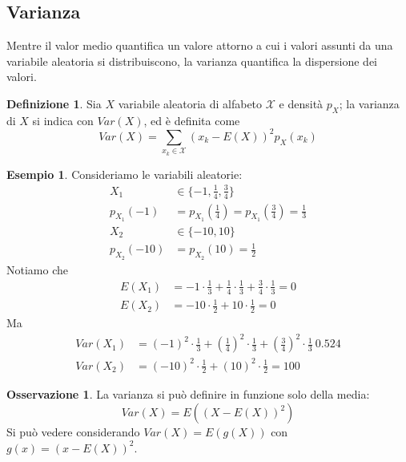 \documentclass{article}
\theoremstyle{plain}
\theoremstyle{definition}
\newtheorem{definizione}{Definizione}[section]
\newtheorem{osservazione}{Osservazione}[section]
\newtheorem{esempio}{Esempio}[section]
\theoremstyle{remark}
\begin{document}
\subsection{Varianza} %
\label{sub:varianza}
Mentre il valor medio quantifica un valore attorno a cui i valori assunti da una variabile aleatoria si distribuiscono, la varianza quantifica la dispersione dei valori.
\begin{definizione}
	Sia $X$ variabile aleatoria di alfabeto $\mathcal{X}$ e densità $p_X$; la varianza di $X$ si indica con $Var(X)$, ed è definita come
	\begin{equation*}
		Var(X)=\sum_{x_k\in\mathcal{X}}(x_k-E(X))^2p_X(x_k)
	\end{equation*}
\end{definizione}
\begin{esempio}
	Consideriamo le variabili aleatorie:
	\begin{align*}
		X_1&\in\{-1,\frac{1}{4},\frac{3}{4}\}\\
		p_{X_1}(-1)&=p_{X_1}(\frac{1}{4})=p_{X_1}(\frac{3}{4})=\frac{1}{3}\\
		X_2&\in\{-10,10\}\\
		p_{X_2}(-10)&=p_{X_2}(10)=\frac{1}{2}
	\end{align*}
	Notiamo che
	\begin{align*}
		E(X_1)&=-1\cdot\frac{1}{3}+\frac{1}{4}\cdot\frac{1}{3}+\frac{3}{4}\cdot\frac{1}{3}=0\\
		E(X_2)&=-10\cdot\frac{1}{2}+10\cdot\frac{1}{2}=0
	\end{align*}
	Ma
	\begin{align*}
		Var(X_1)&=(-1)^2\cdot\frac{1}{3}+(\frac{1}{4})^2\cdot\frac{1}{3}+(\frac{3}{4})^2\cdot\frac{1}{3}~0.524\\
		Var(X_2)&=(-10)^2\cdot\frac{1}{2}+(10)^2\cdot\frac{1}{2}=100
	\end{align*}
\end{esempio}
\begin{osservazione}
	La varianza si può definire in funzione solo della media:
	\begin{equation*}
		Var(X)=E((X-E(X))^2)
	\end{equation*}
	Si può vedere considerando $Var(X)=E(g(X))$ con $g(x)=(x-E(X))^2$.
\end{osservazione}
\end{document}
